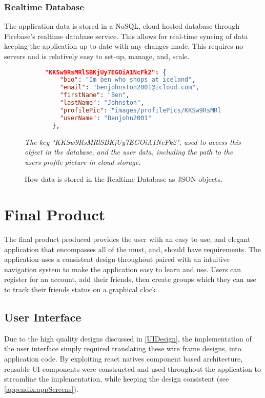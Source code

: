 \subsubsection{Realtime Database}
The application data is stored in a NoSQL, cloud hosted  database through Firebase's realtime database service. This allows for real-time syncing of data keeping the application up to date with any changes made. This requires no servers and is relatively easy to set-up, manage, and, scale.
\begin{figure}[!htbp]
\centering
\begin{subfigure}[b]{0.85\textwidth}
\begin{lstlisting}[language=json]
"KKSw9RsMRlSBKjUy7EGOiA1NcFk2": {
    "bio": "Im ben who shops at iceland",
    "email": "benjohnston2001@icloud.com",
    "firstName": "Ben",
    "lastName": "Johnston",
    "profilePic": "images/profilePics/KKSw9RsMRlSBKjUy7EGOiA1NcFk2",
    "userName": "Benjohn2001"
  },
\end{lstlisting}
\end{subfigure}
\caption{How data is stored in the Realtime Database as JSON objects.}
\small\par\textit{{The key "KKSw9RsMRlSBKjUy7EGOiA1NcFk2", used to access this object in the database, and the user data, including the path to the users profile picture in cloud storage.}}
\label{jsonResp}
\end{figure}

\section{Final Product}
The final product produced provides the user with an easy to use, and elegant application that encompasses all of the must, and, should have requirements. The application uses a consistent design throughout paired with an intuitive navigation system to make the  application easy to learn and use. Users can register for an account, add their friends, then create groups which they can use to track their friends status on a graphical clock.
\subsection{User Interface}
Due to the high quality designs discussed in \ref{UIDesign}, the implementation of the user interface simply required translating these wire frame designs, into application code.
By exploiting react natives component based architecture, reusable UI components were constructed and used throughout the application to streamline the implementation, while keeping the design consistent (see \ref{appendix:appScreens}).
